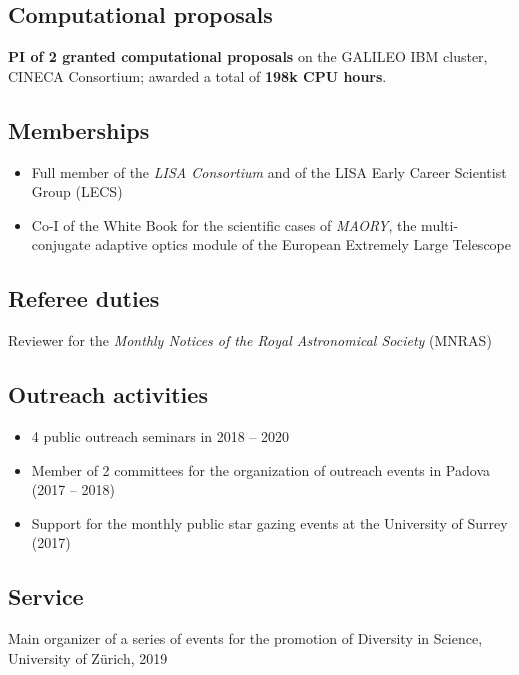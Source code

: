 \subsection*{{Computational proposals}}
\textbf{PI of 2 granted computational proposals} on the GALILEO IBM cluster, CINECA Consortium; awarded a total of \textbf{198k CPU hours}.

\subsection*{{Memberships}}
\begin{itemize}[leftmargin=3.5mm]
\setlength\itemsep{-2pt}
\item Full member of the \textit{{LISA Consortium}} and of the LISA Early Career Scientist Group (LECS)
\item Co-I of the White Book for the scientific cases of  \textit{MAORY}, the multi-conjugate adaptive optics module of the European Extremely Large Telescope
\end{itemize}



\subsection*{{Referee duties}}
Reviewer for the {\it Monthly Notices of the Royal Astronomical Society} (MNRAS)


\subsection*{{Outreach activities}}
\begin{itemize}[leftmargin=3.5mm]
\setlength\itemsep{-2pt}

\item 4 public outreach seminars in 2018 -- 2020

\item Member of 2 committees for the organization of outreach events in Padova (2017 -- 2018)

\item Support for the monthly public star gazing events at the University of Surrey (2017)
\end{itemize}


\subsection*{{Service}}

Main organizer of a series of events for the {promotion of Diversity in Science}, University of Z\"urich, 2019